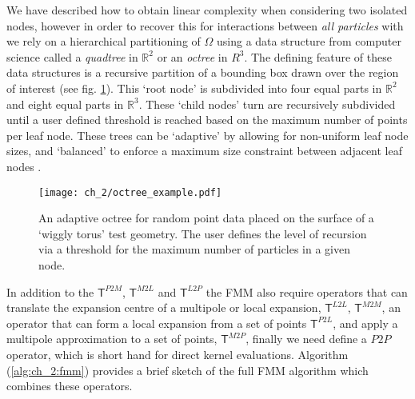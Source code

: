 We have described how to obtain linear complexity when considering two isolated nodes, however in order to recover this for interactions between \textit{all particles} with we rely on a hierarchical partitioning of $\Omega$ using a data structure from computer science called a \textit{quadtree} in $\mathbb{R}^2$ or an \textit{octree} in $\textit{R}^3$. The defining feature of these data structures is a recursive partition of a bounding box drawn over the region of interest (see fig. \ref{fig:ch_2:octree_example}). This ‘root node’ is subdivided into four equal parts in $\mathbb{R}^2$ and eight equal parts in $\mathbb{R}^3$. These ‘child nodes’ turn are recursively subdivided until a user defined threshold is reached based on the maximum number of points per leaf node. These trees can be `adaptive' by allowing for non-uniform leaf node sizes, and `balanced' to enforce a maximum size constraint between adjacent leaf nodes \cite{sundar2008bottom}.

\begin{figure}
    \centering
    \texttt{[image: ch\_2/octree\_example.pdf]}
    \caption{An adaptive octree for random point data placed on the surface of a `wiggly torus' test geometry. The user defines the level of recursion via a threshold for the maximum number of particles in a given node.}
    \label{fig:ch_2:octree_example}
\end{figure}

In addition to the $\mathsf{T}^{P2M}$, $\mathsf{T}^{M2L}$ and $\mathsf{T}^{L2P}$ the FMM also require operators that can translate the expansion centre of a multipole or local expansion, $\mathsf{T}^{L2L}$, $\mathsf{T}^{M2M}$, an operator that can form a local expansion from a set of points $\mathsf{T}^{P2L}$, and apply a multipole approximation to a set of points, $\mathsf{T}^{M2P}$, finally we need define a $P2P$ operator, which is short hand for direct kernel evaluations. Algorithm (\ref{alg:ch_2:fmm}) provides a brief sketch of the full FMM algorithm which combines these operators.

